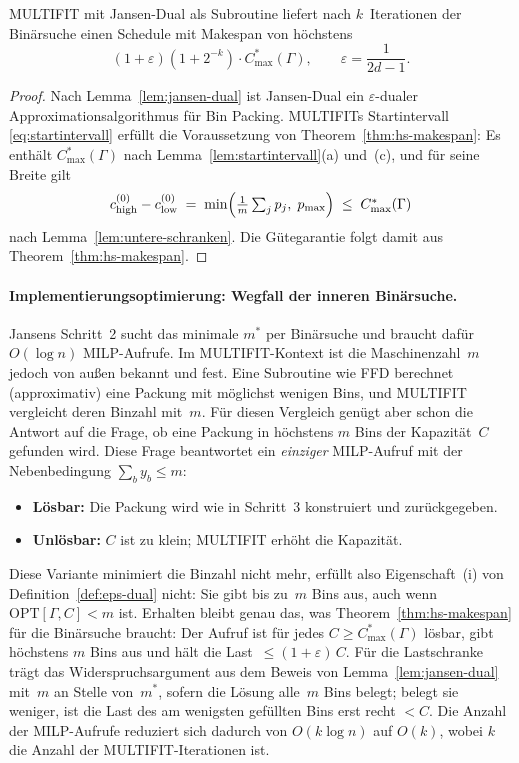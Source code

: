 \begin{korollar}
\label{kor:multifit-jansen-dual}
  MULTIFIT mit Jansen-Dual als Subroutine liefert nach $k$~Iterationen
  der Binärsuche einen Schedule mit Makespan von höchstens
  \[
    (1+\varepsilon)(1+2^{-k})\cdot C^{*}_{\max}(\Gamma),
    \qquad \varepsilon = \frac{1}{2d-1}.
  \]
\end{korollar}

\begin{proof}
  Nach Lemma~\ref{lem:jansen-dual} ist Jansen-Dual ein $\varepsilon$-dualer Approximationsalgorithmus
  für Bin Packing.
  MULTIFITs Startintervall \eqref{eq:startintervall} erfüllt die Voraussetzung von
  Theorem~\ref{thm:hs-makespan}: Es enthält $C^{*}_{\max}(\Gamma)$ nach
  Lemma~\ref{lem:startintervall}(a) und~(c), und für seine Breite gilt
  \[
    c_{\mathrm{high}}^{(0)} - c_{\mathrm{low}}^{(0)}
    \;=\; \min\Bigl( \tfrac{1}{m}\textstyle\sum_j p_j,\; p_{\max} \Bigr)
    \;\le\; C^{*}_{\max}(\Gamma)
  \]
  nach Lemma~\ref{lem:untere-schranken}.
  Die Gütegarantie folgt damit aus Theorem~\ref{thm:hs-makespan}.
\end{proof}

\paragraph{Implementierungsoptimierung: Wegfall der inneren Binärsuche.}
Jansens Schritt~2 sucht das minimale $m^*$ per Binärsuche und braucht dafür $O(\log n)$ MILP-Aufrufe.
Im MULTIFIT-Kontext ist die Maschinenzahl~$m$ jedoch von außen bekannt und fest.
Eine Subroutine wie FFD berechnet (approximativ) eine Packung mit möglichst wenigen Bins, und
MULTIFIT vergleicht deren Binzahl mit~$m$.
Für diesen Vergleich genügt aber schon die Antwort auf die Frage, ob eine Packung in höchstens
$m$ Bins der Kapazität~$C$ gefunden wird.
Diese Frage beantwortet ein \emph{einziger} MILP-Aufruf mit der Nebenbedingung
$\sum_{b} y_b \leq m$:
\begin{itemize}[nosep]
  \item \textbf{Lösbar:} Die Packung wird wie in Schritt~3 konstruiert und zurückgegeben.
  \item \textbf{Unlösbar:} $C$ ist zu klein; MULTIFIT erhöht die Kapazität.
\end{itemize}
Diese Variante minimiert die Binzahl nicht mehr, erfüllt also Eigenschaft~(i) von
Definition~\ref{def:eps-dual} nicht: Sie gibt bis zu~$m$ Bins aus, auch wenn
$\mathrm{OPT}[\Gamma, C] < m$ ist.
Erhalten bleibt genau das, was Theorem~\ref{thm:hs-makespan} für die Binärsuche braucht:
Der Aufruf ist für jedes $C \ge C^{*}_{\max}(\Gamma)$ lösbar, gibt höchstens $m$ Bins aus und
hält die Last~$\le (1+\varepsilon)\,C$.
Für die Lastschranke trägt das Widerspruchsargument aus dem Beweis von
Lemma~\ref{lem:jansen-dual} mit~$m$ an Stelle von~$m^*$, sofern die Lösung alle~$m$ Bins
belegt; belegt sie weniger, ist die Last des am wenigsten gefüllten Bins erst recht $< C$.
Die Anzahl der MILP-Aufrufe reduziert sich dadurch von
$O(k \log n)$ auf $O(k)$, wobei $k$ die Anzahl der MULTIFIT-Iterationen ist.

